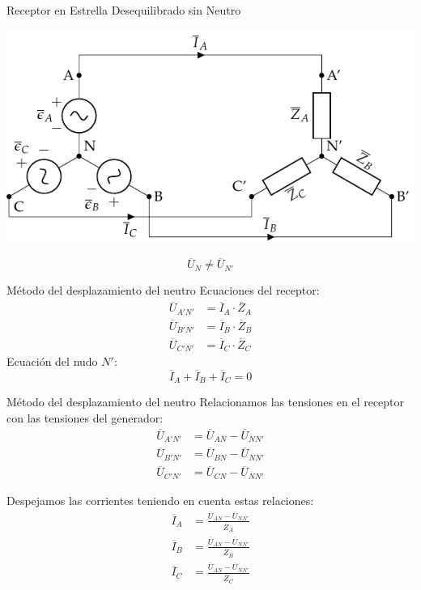 \documentclass[aspectratio=169, usenames,svgnames,dvipsnames]{beamer}
\begin{document}
\begin{frame}[label={sec:orgf8cb5ce}]{Receptor en Estrella Desequilibrado sin Neutro}
\begin{center}
\includegraphics[width=.9\linewidth]{../figs/EstrellaDesequilibrado_SinNeutro.pdf}
\end{center}

\[
\overline{U}_N \neq \overline{U}_{N'}
\]
\end{frame}

\begin{frame}[label={sec:orgfb75187}]{Método del desplazamiento del neutro}
Ecuaciones del receptor:
\begin{align*}
  \overline{U}_{A'N'} &= \overline{I}_A \cdot \overline{Z}_A\\
  \overline{U}_{B'N'} &= \overline{I}_B \cdot \overline{Z}_B\\
  \overline{U}_{C'N'} &= \overline{I}_C \cdot \overline{Z}_C
\end{align*}
Ecuación del nudo \(N'\):
\[
  \overline{I}_A + \overline{I}_B + \overline{I}_C = 0
\]
\end{frame}

\begin{frame}[label={sec:org8ab156d}]{Método del desplazamiento del neutro}
Relacionamos las tensiones en el receptor con las tensiones del generador:
\begin{align*}
  \overline{U}_{A'N'} &= \overline{U}_{AN} - \overline{U}_{NN'}\\
  \overline{U}_{B'N'} &= \overline{U}_{BN} - \overline{U}_{NN'}\\
  \overline{U}_{C'N'} &= \overline{U}_{CN} - \overline{U}_{NN'}
\end{align*}

Despejamos las corrientes teniendo en cuenta estas relaciones:
\begin{align*}
  \overline{I}_A &= \frac{\overline{U}_{AN} - \overline{U}_{NN'}}{\overline{Z}_A}\\
  \overline{I}_B &= \frac{\overline{U}_{AN} - \overline{U}_{NN'}}{\overline{Z}_B}\\
  \overline{I}_C &= \frac{\overline{U}_{AN} - \overline{U}_{NN'}}{\overline{Z}_C}
\end{align*}
\end{frame}
\end{document}

